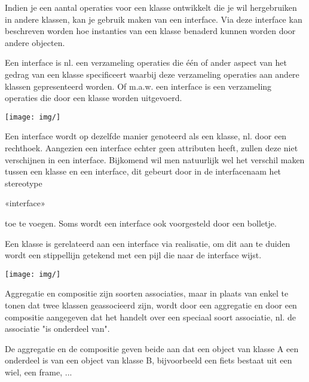 
Indien je een aantal operaties voor een klasse ontwikkelt die je wil hergebruiken in andere klassen, kan je gebruik maken van een interface. Via deze interface kan beschreven worden hoe instanties van een klasse benaderd kunnen worden door andere objecten.

Een interface is nl. een verzameling operaties die één of ander aspect van het gedrag van een klasse specificeert waarbij deze verzameling operaties aan andere klassen gepresenteerd worden.
Of m.a.w. een interface is een verzameling operaties die door een klasse worden uitgevoerd.


\begin{center}
\texttt{[image: img/]}%
\label{labelname}%
\end{center}

Een interface wordt op dezelfde manier genoteerd als een klasse, nl. door een rechthoek. Aangezien een interface echter geen attributen heeft, zullen deze niet verschijnen in een interface.
Bijkomend wil men natuurlijk wel het verschil maken tussen een klasse en een interface, dit gebeurt door in de interfacenaam het stereotype

«interface»

toe te voegen. Soms wordt een interface ook voorgesteld door een bolletje.

Een klasse is gerelateerd aan een interface via realisatie, om dit aan te duiden wordt een stippellijn getekend met een pijl die naar de interface wijst.


\begin{center}
\texttt{[image: img/]}%
\label{labelname}%
\end{center}



Aggregatie en compositie zijn soorten associaties, maar in plaats van enkel te tonen dat twee klassen geassocieerd zijn, wordt door een aggregatie en door een compositie aangegeven dat het handelt over een speciaal soort associatie, nl. de associatie "is onderdeel van".

De aggregatie en de compositie geven beide aan dat een object van klasse A een onderdeel is van een object van klasse B, bijvoorbeeld een fiets bestaat uit een wiel, een frame, ...

